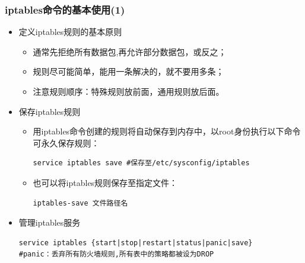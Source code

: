 \documentclass[xcolor=svgnames,presentation]{beamer}
\begin{document}
\begin{frame}[fragile]
\frametitle{iptables命令的基本使用(1)}
\label{sec-2-34}
\begin{itemize}

\item 定义iptables规则的基本原则
\label{sec-2-34-1}%
\begin{itemize}

\item 通常先拒绝所有数据包,再允许部分数据包，或反之；
\label{sec-2-34-1-1}%

\item 规则尽可能简单，能用一条解决的，就不要用多条；
\label{sec-2-34-1-2}%

\item 注意规则顺序：特殊规则放前面，通用规则放后面。
\label{sec-2-34-1-3}%
\end{itemize} %

\item 保存iptables规则
\label{sec-2-34-2}%
\begin{itemize}

\item 用iptables命令创建的规则将自动保存到内存中，以root身份执行以下命令可永久保存规则：\\
\label{sec-2-34-2-1}%
\begin{verbatim}
service iptables save #保存至/etc/sysconfig/iptables
\end{verbatim}

\item 也可以将iptables规则保存至指定文件：\\
\label{sec-2-34-2-2}%
\begin{verbatim}
iptables-save 文件路径名
\end{verbatim}
\end{itemize} %

\item 管理iptables服务\\
\label{sec-2-34-3}%
\begin{verbatim}
service iptables {start|stop|restart|status|panic|save}
#panic：丢弃所有防火墙规则,所有表中的策略都被设为DROP
\end{verbatim}
\end{itemize} %
\end{frame}
\end{document}
